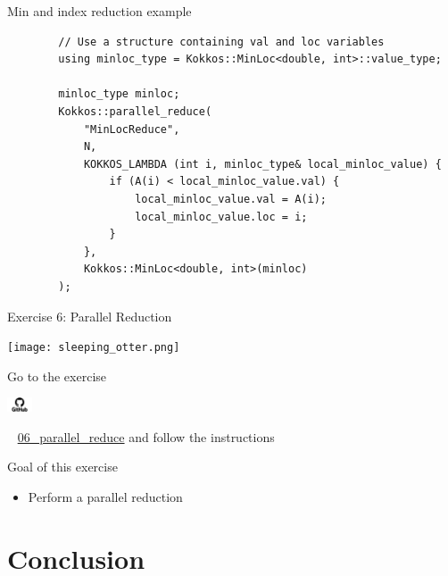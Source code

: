 \documentclass[aspectratio=169]{beamer}
\newcommand{\githublink}[2][2em]{%
    \hspace{-0.25em}%
    \parbox[c][#1][c]{#1}{%
        \includegraphics[width=#1]{GitHub-logo.png}%
    }%
    \hspace{-0.25em}%
    ~%
    #2%
}
\begin{document}

\begin{frame}[fragile]{Min and index reduction example}
    \begin{verbatim}
        // Use a structure containing val and loc variables
        using minloc_type = Kokkos::MinLoc<double, int>::value_type;

        minloc_type minloc;
        Kokkos::parallel_reduce(
            "MinLocReduce",
            N,
            KOKKOS_LAMBDA (int i, minloc_type& local_minloc_value) {
                if (A(i) < local_minloc_value.val) {
                    local_minloc_value.val = A(i);
                    local_minloc_value.loc = i;
                }
            },
            Kokkos::MinLoc<double, int>(minloc)
        );
    \end{verbatim}
\end{frame}


\begin{frame}{Exercise 6: Parallel Reduction}
    \begin{center}
        \texttt{[image: sleeping\_otter.png]}
    \end{center}

    Go to the exercise \githublink{\href{https://github.com/CExA-project/cexa-kokkos-tutorials/tree/main/exercises/06_parallel_reduce}{06\_parallel\_reduce}} and follow the instructions

    \begin{block}{Goal of this exercise}
        \begin{itemize}
            \item Perform a parallel reduction
        \end{itemize}
    \end{block}
\end{frame}


\section[Conclusion]{Conclusion}

\end{document}
